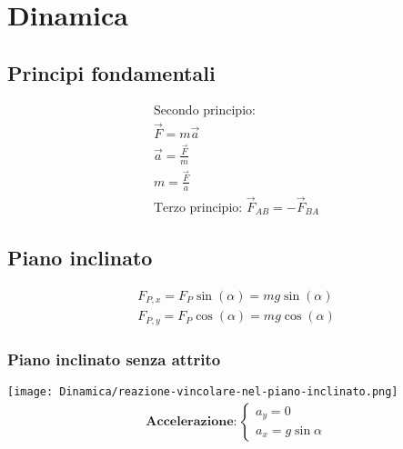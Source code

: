 \section{Dinamica}

    \subsection{Principi fondamentali}
        \begin{gather*}
            \text{Secondo principio: } \\
            \vec{F} = m \vec{a} \\
            \vec{a} = \frac{\vec{F}}{m} \\
            m = \frac{\vec{F}}{a} \\
            \text{Terzo principio: } \vec{F}_{AB} = -\vec{F}_{BA}
        \end{gather*}

    \subsection{Piano inclinato}
        \begin{gather*}
            F_{P, x} = F_P \sin (\alpha) = m g \sin (\alpha) \\
            F_{P, y} = F_P \cos (\alpha) = m g \cos (\alpha)
        \end{gather*}

        \subsubsection{Piano inclinato senza attrito}
            \texttt{[image: Dinamica/reazione-vincolare-nel-piano-inclinato.png]} \\
            \begin{gather*}
            \textbf{Accelerazione}: \begin{cases}
                a_y = 0 \\
                a_x = g \sin{\alpha}
            \end{cases}
            \end{gather*}

